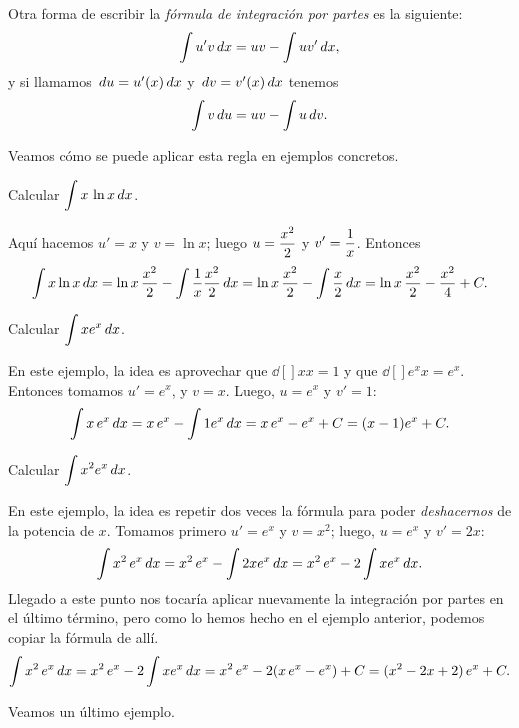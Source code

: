 Otra forma de escribir la \emph{fórmula de integración por partes} es la siguiente:
$$
\int u'v \,dx = uv - \int u v'\,dx,
$$
y si llamamos $\,du = u'(x)\,dx$ y $\,dv = v'(x)\,dx$ tenemos
$$
\int v \,du = uv - \int u \,dv.
$$

Veamos cómo se puede aplicar esta regla en ejemplos concretos.

\begin{example}
  Calcular $\displaystyle\int x\,\ln x\,dx$.

  Aquí hacemos $u'= x$ y $v=\ln x$; luego $\displaystyle u=\frac{x^2}2$ y $\displaystyle v'=\frac1x$. 
  Entonces
  \[
  \int x \ln x\,dx 
  = \ln x \, \frac{x^2}2 - \int \frac1x \frac{x^2}{2}\,dx
  = \ln x \, \frac{x^2}2 - \int \frac{x}{2}\,dx
  = \ln x \, \frac{x^2}2 - \frac{x^2}{4} + C.
  \]  
\end{example}

\begin{example}
  Calcular $\displaystyle \int x e^x\,dx$.

  En este ejemplo, la idea es aprovechar que $\dd[]{x}{x}=1$ y que $\dd[]{e^x}{x}=e^x$. Entonces tomamos $u'=e^x$, y $v=x$. Luego, $u=e^x$ y $v'=1$:
  \[
  \int x\, e^x\,dx = x\,e^x - \int 1 e^x\,dx = x\, e^x - e^x+C = (x-1)e^x+C.
  \]
\end{example}

\begin{example}
  Calcular $\displaystyle \int x^2 e^x\,dx$.

  En este ejemplo, la idea es repetir dos veces la fórmula para poder \emph{deshacernos} de la potencia de $x$. Tomamos primero $u'=e^x$ y $v=x^2$; luego, $u=e^x$ y $v'=2x$:
  \[
  \int x^2\, e^x\,dx 
  = x^2\,e^x - \int 2x e^x\,dx 
  = x^2\,e^x - 2\int x e^x\,dx .
  \]
  Llegado a este punto nos tocaría aplicar nuevamente la integración por partes en el último término, pero como lo hemos hecho en el ejemplo anterior, podemos copiar la fórmula de allí.
  \[
  \int x^2\, e^x\,dx 
  = x^2\,e^x - 2\int x e^x\,dx 
  = x^2\,e^x - 2(x\, e^x - e^x) + C
  = (x^2-2x+2)\,e^x + C.
  \]
\end{example}

Veamos un último ejemplo.

